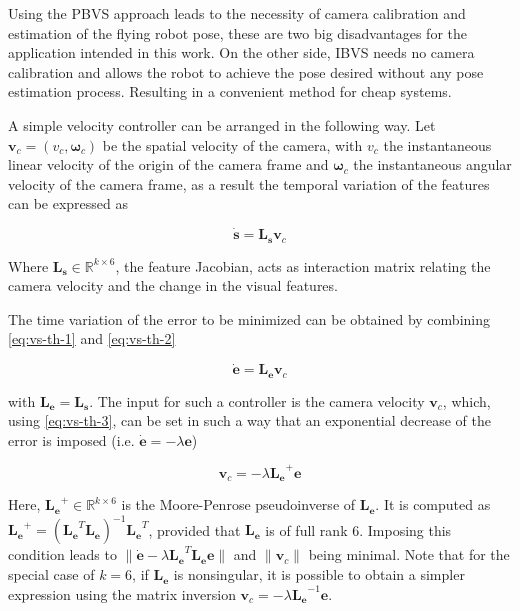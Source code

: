 
Using the PBVS approach leads to the necessity of camera calibration and estimation of the flying robot pose, these are two big disadvantages for the application intended in this work. On the other side, IBVS needs no camera calibration and allows the robot to achieve the pose desired without any pose estimation process. Resulting in a convenient method for cheap systems.

A simple velocity controller can be arranged in the following way. Let $\bm{v}_c = (v_c, \bm{\omega}_c)$ be the spatial velocity of the camera, with $v_c$ the instantaneous linear velocity of the origin of the camera frame and $\bm{\omega}_c$ the instantaneous angular velocity of the camera frame, as a result the temporal variation of the features can be expressed as

\begin{equation}
\dot{\bm{s}} = \bm{L_s} \bm{v}_c
\label{eq:vs-th-2}
\end{equation}

Where $\bm{L_s} \in \mathbb{R}^{k \times 6}$, the feature Jacobian, acts as interaction matrix relating the camera velocity and the change in the visual features.

The time variation of the error to be minimized can be obtained by combining \ref{eq:vs-th-1} and \ref{eq:vs-th-2}

\begin{equation}
\dot{\bm{e}} = \bm{L_e} \bm{v}_c
\label{eq:vs-th-3}
\end{equation}

with $\bm{L_e} = \bm{L_s}$. The input for such a controller is the camera velocity  $\bm{v}_c$, which, using \ref{eq:vs-th-3}, can be set in such a way that an exponential decrease of the error is imposed (i.e. $\dot{\bm{e}} = - \lambda \bm{e}$) 

\begin{equation}
\bm{v}_c = - \lambda \bm{L_e}^+ \bm{e}
\label{eq:vs-th-4}
\end{equation}

Here, $\bm{L_e}^+ \in \mathbb{R}^{k \times 6}$ is the Moore-Penrose pseudoinverse of $\bm{L_e}$. It is computed as $\bm{L_e}^+ = (\bm{L_e}^T \bm{L_e})^{-1} \bm{L_e}^T$, provided that $\bm{L_e}$ is of full rank 6. Imposing this condition leads to $\| \dot{\bm{e}} - \lambda \bm{L_e}^T \bm{L_e} \bm{e} \|$ and $\| \bm{v}_c \|$ being minimal. Note that for the special case of $k=6$, if $\bm{L_e}$ is nonsingular, it is possible to obtain a simpler expression using the matrix inversion $\bm{v}_c = - \lambda \bm{L_e}^{-1} \bm{e}$.

